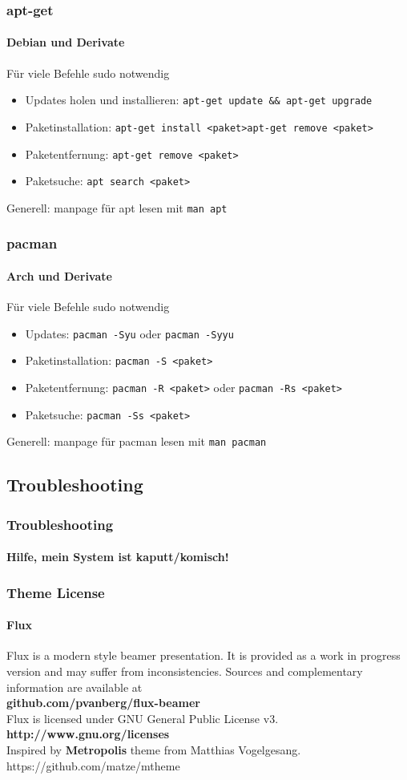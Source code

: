 \documentclass[9pt]{beamer}
\begin{document}
\begin{frame}
 \frametitle{apt-get}
 \framesubtitle{Debian und Derivate}
 Für viele Befehle sudo notwendig
 \begin{itemize}
  \item Updates holen und installieren: \texttt{apt-get update \&\& apt-get upgrade}
  \item Paketinstallation: \texttt{apt-get install <paket>}\texttt{apt-get remove <paket>}
  \item Paketentfernung: \texttt{apt-get remove <paket>}
  \item Paketsuche:  \texttt{apt search <paket>}
 \end{itemize}
 Generell: manpage für apt lesen mit \texttt{man apt}

\end{frame}

\begin{frame}
 \frametitle{pacman}
 \framesubtitle{Arch und Derivate}
  Für viele Befehle sudo notwendig
 \begin{itemize}
  \item Updates: \texttt{pacman -Syu} oder \texttt{pacman -Syyu}
  \item Paketinstallation: \texttt{pacman -S <paket>}
  \item Paketentfernung: \texttt{pacman -R <paket>} oder \texttt{pacman -Rs <paket>}
  \item Paketsuche: \texttt{pacman -Ss <paket>}
 \end{itemize}
 Generell: manpage für pacman lesen mit \texttt{man pacman}
\end{frame}

\subsection{Troubleshooting}
\begin{frame}
 \frametitle{Troubleshooting}
 \framesubtitle{Hilfe, mein System ist kaputt/komisch!}

\end{frame}

\begin{frame}
 \centering
 \frametitle{Theme License}
 \framesubtitle{Flux}
 	\justifying
 Flux is a modern style beamer presentation. It is provided as a work in progress version and may suffer from inconsistencies. Sources and complementary information are available at\\[0.3cm]
 	\centering\textbf{github.com/pvanberg/flux-beamer}\\
 Flux is licensed under GNU General Public License v3.\\[0.3cm]
 	\centering\textbf{http://www.gnu.org/licenses}\\[0.3cm]
Inspired by \textbf{Metropolis} theme from Matthias Vogelgesang.\\
https://github.com/matze/mtheme 
 
\end{frame}
\end{document}
